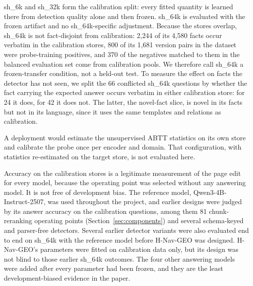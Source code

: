 \documentclass[11pt]{article}
\newcommand{\sub}[1]{\textsf{sh\_#1}}                    %
\newcommand{\geo}{H-Nav-GEO}
\begin{document}
\sub{6k} and \sub{32k} form the calibration split: every fitted quantity is learned there from detection quality alone and then frozen. \sub{64k} is evaluated with the frozen artifact and no \sub{64k}-specific adjustment. Because the stores overlap, \sub{64k} is not fact-disjoint from calibration: 2,244 of its 4,580 facts occur verbatim in the calibration stores, 800 of its 1,681 version pairs in the dataset were probe-training positives, and 370 of the negatives matched to them in the balanced evaluation set come from calibration pools. We therefore call \sub{64k} a frozen-transfer condition, not a held-out test. To measure the effect on facts the detector has not seen, we split the 66 conflicted \sub{64k} questions by whether the fact carrying the expected answer occurs verbatim in either calibration store: for 24 it does, for 42 it does not. The latter, the novel-fact slice, is novel in its facts but not in its language, since it uses the same templates and relations as calibration.

A deployment would estimate the unsupervised ABTT statistics on its own store and calibrate the probe once per encoder and domain. That configuration, with statistics re-estimated on the target store, is not evaluated here.

Accuracy on the calibration stores is a legitimate measurement of the page edit for every model, because the operating point was selected without any answering model. It is not free of development bias. The reference model, Qwen3-4B-Instruct-2507, was used throughout the project, and earlier designs were judged by its answer accuracy on the calibration questions, among them 81 chunk-reranking operating points (Section~\ref{sec:components}) and several schema-keyed and parser-free detectors. Several earlier detector variants were also evaluated end to end on \sub{64k} with the reference model before \geo{} was designed. \geo{}'s parameters were fitted on calibration data only, but its design was not blind to those earlier \sub{64k} outcomes. The four other answering models were added after every parameter had been frozen, and they are the least development-biased evidence in the paper.
\end{document}

